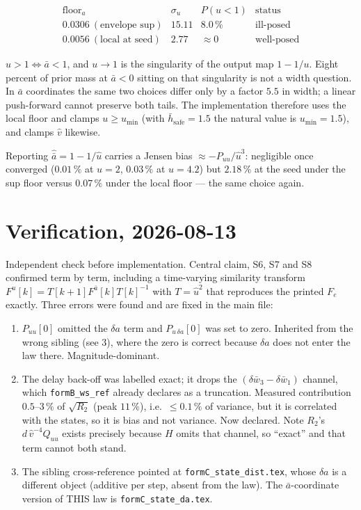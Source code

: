 \documentclass[11pt,a4paper,fontset=none]{ctexart}
\newcommand{\ba}{\bar{a}}
\newcommand{\bw}{\bar{w}}
\begin{document}
\begin{equation*}
\begin{array}{lccc}
\mathrm{floor}_a & \sigma_u & P(u<1) & \text{status} \\[0.2em]
0.0306\ (\text{envelope sup}) & 15.11 & 8.0\,\% & \text{ill-posed} \\
0.0056\ (\text{local at seed}) & 2.77 & \approx 0 & \text{well-posed}
\end{array}
\end{equation*}

$u>1 \Leftrightarrow \ba<1$, and $u \to 1$ is the singularity of the output map
$1-1/u$. Eight percent of prior mass at $\ba<0$ sitting on that singularity is
not a width question. In $\ba$ coordinates the same two choices differ only by a
factor $5.5$ in width; a linear push-forward cannot preserve both tails. The
implementation therefore uses the local floor and clamps $u \geq u_{\min}$
(with $\bar h_{\mathrm{safe}} = 1.5$ the natural value is $u_{\min} = 1.5$),
and clamps $\hat v$ likewise.

Reporting $\hat{\ba} = 1-1/\hat u$ carries a Jensen bias $\approx
-P_{uu}/\hat u^{3}$: negligible once converged ($0.01\,\%$ at $u=2$,
$0.03\,\%$ at $u=4.2$) but $2.18\,\%$ at the seed under the sup floor versus
$0.07\,\%$ under the local floor --- the same choice again.

\section*{Verification, 2026-08-13}

Independent check before implementation. Central claim, S6, S7 and S8 confirmed
term by term, including a time-varying similarity transform
$F^{u}[k] = T[k+1]F^{\ba}[k]T[k]^{-1}$ with $T = \hat u^{2}$ that reproduces the
printed $F_e$ exactly. Three errors were found and are fixed in the main file:

\begin{enumerate}
\item $P_{uu}[0]$ omitted the $\delta a$ term and $P_{u\,\delta a}[0]$ was set to
zero. Inherited from the wrong sibling (see 3), where the zero is correct
because $\delta a$ does not enter the law there. Magnitude-dominant.
\item The delay back-off was labelled exact; it drops the
$(\delta\bw_3-\delta\bw_1)$ channel, which \texttt{formB\_ws\_ref} already
declares as a truncation. Measured contribution $0.5$--$3\,\%$ of $\sqrt{R_2}$
(peak $11\,\%$), i.e.\ $\leq 0.1\,\%$ of variance, but it is correlated with the
states, so it is bias and not variance. Now declared. Note $R_2$'s $d\,\hat
v^{-4}Q_{uu}$ exists precisely because $H$ omits that channel, so ``exact'' and
that term cannot both stand.
\item The sibling cross-reference pointed at \texttt{formC\_state\_dist.tex},
whose $\delta a$ is a different object (additive per step, absent from the law).
The $\ba$-coordinate version of THIS law is \texttt{formC\_state\_da.tex}.
\end{enumerate}
\end{document}

